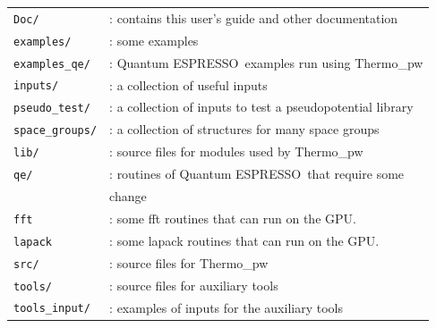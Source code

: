 \documentclass[12pt,a4paper,twoside]{report}
\def\qe{{\sc Quantum ESPRESSO}}
\def\thermo{{\sc Thermo}\_{\sc pw}}
\begin{document}
\begin{tabular}{ll}
\texttt{Doc/}      & : contains this user's guide and other documentation\\
\texttt{examples/} & : some examples \\
\texttt{examples\_qe/} & : \qe\ examples run using 
\thermo \\
\texttt{inputs/}   & : a collection of useful inputs \\
\texttt{pseudo\_test/} & : a collection of inputs to test a pseudopotential library\\
\texttt{space\_groups/} & : a collection of structures for many space groups \\
\texttt{lib/}      & : source files for modules used by \thermo\ \\
\texttt{qe/}       & : routines of \qe\ that require some \\
                   &   change \\
\texttt{fft}       & : some fft routines that can run on the GPU. \\
\texttt{lapack}    & : some lapack routines that can run on the GPU. \\
\texttt{src/}      & : source files for \thermo\ \\
\texttt{tools/}    & : source files for auxiliary tools \\
\texttt{tools\_input/}  & : examples of inputs for the auxiliary tools \\
\end{tabular}\\
\end{document}
